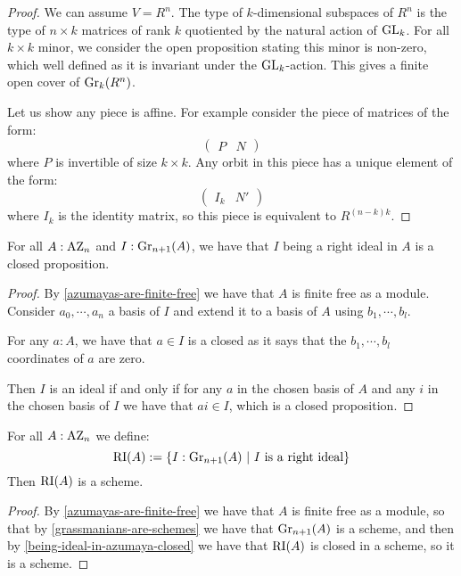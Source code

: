 \begin{proof}
We can assume $V=R^n$. The type of $k$-dimensional subspaces of $R^n$ is the type of $n\times k$ matrices of rank $k$ quotiented by the natural action of $\operatorname{GL}_k$. For all $k\times k$ minor, we consider the open proposition stating this minor is non-zero, which well defined as it is invariant under the $\operatorname{GL}_k$-action. This gives a finite open cover of $\mathrm{Gr}_k(R^n)$.

Let us show any piece is affine. For example consider the piece of matrices of the form:
\[\begin{pmatrix}
P & N
\end{pmatrix}\]
where $P$ is invertible of size $k\times k$. Any orbit in this piece has a unique element of the form:
\[\begin{pmatrix}
I_k & N'
\end{pmatrix}\]
where $I_k$ is the identity matrix, so this piece is equivalent to $R^{(n-k)k}$.
\end{proof}

\begin{lemma}\label{being-ideal-in-azumaya-closed}
For all $A:\mathrm{AZ}_n$ and $I:\mathrm{Gr}_{n+1}(A)$, we have that $I$ being a right ideal in $A$ is a closed proposition.
\end{lemma}

\begin{proof}
By \cref{azumayas-are-finite-free} we have that $A$ is finite free as a module. Consider $a_0,\cdots,a_n$ a basis of $I$ and extend it to a basis of $A$ using $b_1,\cdots,b_l$. 

For any $a:A$, we have that $a\in I$ is a closed as it says that the $b_1,\cdots,b_l$ coordinates of $a$ are zero. 

Then $I$ is an ideal if and only if for any $a$ in the chosen basis of $A$ and any $i$ in the chosen basis of $I$ we have that $ai\in I$, which is a closed proposition.
\end{proof}

\begin{lemma}\label{severi-brauer-are-schemes}
For all $A:\mathrm{AZ}_n$ we define:
\[\RI(A) := \{I:\Gr_{n+1}(A)\ |\ I\ \mathrm{is\ a\ right\ ideal}\}\]
Then $\mathrm{RI}(A)$ is a scheme.
\end{lemma}

\begin{proof}
By \cref{azumayas-are-finite-free} we have that $A$ is finite free as a module, so that by \cref{grassmanians-are-schemes} we have that $\mathrm{Gr}_{n+1}(A)$ is a scheme, and then by \cref{being-ideal-in-azumaya-closed} we have that $\mathrm{RI}(A)$ is closed in a scheme, so it is a scheme.
\end{proof}



